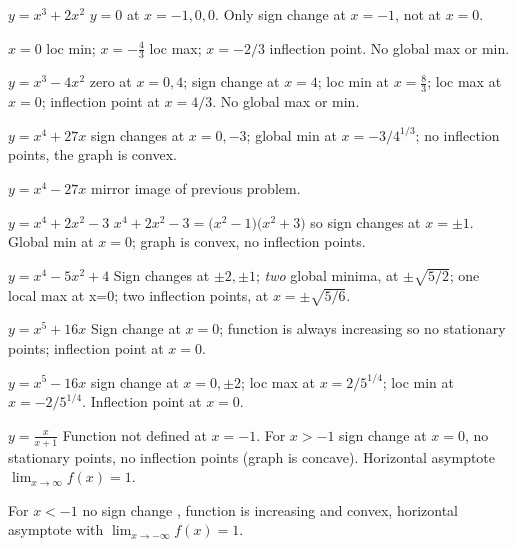 \begin{multicols}{2}
\problem $\displaystyle y=x^3+2x^2 $ %
\answer %
$y=0$ at $x=-1, 0, 0$.  Only sign change at $x=-1$, not at $x=0$.

$x=0$ loc min;  $x=-\frac43$ loc max;  $x=-2/3$ inflection point.
No global max or min.
\endanswer




\problem $\displaystyle y=x^3-4x^2$ %
\answer %
zero at $x=0, 4$; sign change at $x=4$; loc min at $x=\frac83$; loc
max at $x=0$; inflection point at $x=4/3$.  No global max or min.
\endanswer




\problem $\displaystyle y=x^4+27x $ %
\answer %
sign changes at $x=0, -3$;  global min at $x=-3/4^{1/3}$; no inflection
points, the graph is convex.
\endanswer




\problem $\displaystyle y=x^4-27x$ %
\answer %
mirror image of previous problem.
\endanswer




\problem $\displaystyle y=x^4+2x^2-3 $ %
\answer %
$x^4+2x^2-3 = \bigl(x^2-1\bigr)\bigl(x^2+3\bigr)$ so sign changes at
$x=\pm1$.  Global min at $x=0$;  graph is convex, no inflection points.
\endanswer




\problem $\displaystyle y=x^4-5x^2+4 $ %
\answer %
Sign changes at $\pm2, \pm1$;  \emph{two} global minima, at $\pm\sqrt{5/2}$;
one local max at x=0;  two inflection points, at $x=\pm\sqrt{5/6}$.
\endanswer




\problem $\displaystyle y=x^5+16x$ %
\answer %
Sign change at $x=0$;  function is always increasing so no stationary
points;  inflection point at $x=0$.
\endanswer




\problem $\displaystyle y=x^5-16x$ %
\answer %
sign change at $x=0, \pm 2$;  loc max at $x=2/5^{1/4}$; loc min at
$x=-2/5^{1/4}$. Inflection point at $x=0$.
\endanswer




\problem $\displaystyle y=\frac{x} {x+1}$ %
\answer %
Function not defined at $x=-1$.  For $x>-1$ sign change at $x=0$, no
stationary points, no inflection points (graph is concave).
Horizontal asymptote $\lim_{x\to \infty}f(x) = 1$.




For $x<-1$ no sign change , function is increasing and convex, horizontal
asymptote with $\lim_{x\to-\infty}f(x) = 1$.
\endanswer





\end{multicols}
